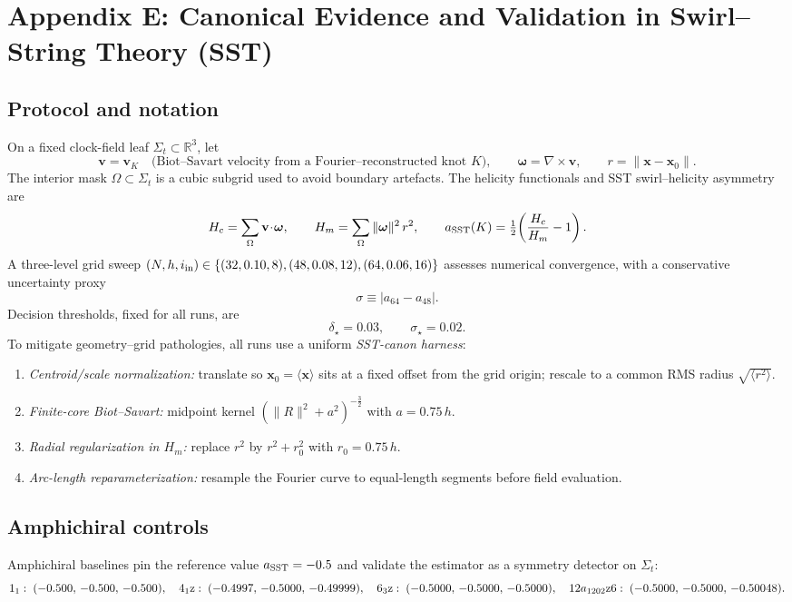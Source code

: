\documentclass[11pt, preprint,titlepage]{revtex4-2}
\begin{document}
\section*{Appendix E: Canonical Evidence and Validation in Swirl--String Theory (SST)}
\label{sec:canon-validation}

\subsection{Protocol and notation}
On a fixed clock-field leaf \(\Sigma_t\subset\mathbb{R}^3\), let
\[
\mathbf v=\mathbf v_K \quad\text{(Biot--Savart velocity from a Fourier–reconstructed knot \(K\))},\qquad
\boldsymbol\omega=\nabla\times\mathbf v,\qquad
r=\|\mathbf x-\mathbf x_0\|.
\]
The interior mask \(\Omega\subset\Sigma_t\) is a cubic subgrid used to avoid boundary artefacts. The helicity functionals and SST swirl–helicity asymmetry are
\[
H_c=\sum_{\Omega}\mathbf v\!\cdot\!\boldsymbol\omega,\qquad
H_m=\sum_{\Omega}\|\boldsymbol\omega\|^2\,r^2,\qquad
a_{\rm SST}(K)=\tfrac12\!\left(\frac{H_c}{H_m}-1\right).
\]
A three-level grid sweep \((N,h,i_{\rm in})\in\{(32,0.10,8),(48,0.08,12),(64,0.06,16)\}\) assesses numerical convergence, with a conservative uncertainty proxy
\[
\sigma \equiv |a_{64}-a_{48}|.
\]
Decision thresholds, fixed for all runs, are
\[
\delta_\star=0.03,\qquad \sigma_\star=0.02.
\]
To mitigate geometry–grid pathologies, all runs use a uniform \emph{SST-canon harness}:
\begin{enumerate}
\item \emph{Centroid/scale normalization:} translate so \(\mathbf x_0=\langle\mathbf x\rangle\) sits at a fixed offset from the grid origin; rescale to a common RMS radius \(\sqrt{\langle r^2\rangle}\).
\item \emph{Finite-core Biot--Savart:} midpoint kernel \((\|R\|^2+a^2)^{-\frac{3}{2}}\) with \(a=0.75\,h\).
\item \emph{Radial regularization in \(H_m\):} replace \(r^2\) by \(r^2+r_0^2\) with \(r_0=0.75\,h\).
\item \emph{Arc-length reparameterization:} resample the Fourier curve to equal-length segments before field evaluation.
\end{enumerate}

\subsection{Amphichiral controls}
Amphichiral baselines pin the reference value \(a_{\rm SST}=-0.5\) and validate the estimator as a symmetry detector on \(\Sigma_t\):
\[
1_1:\;(-0.500,\,-0.500,\,-0.500),\quad
4_1{\rm z}:\;(-0.4997,\,-0.5000,\,-0.49999),\quad
6_3{\rm z}:\;(-0.5000,\,-0.5000,\,-0.5000),\quad
12a_{1202}{\rm z6}:\;(-0.5000,\,-0.5000,\,-0.50048).
\]
\end{document}
